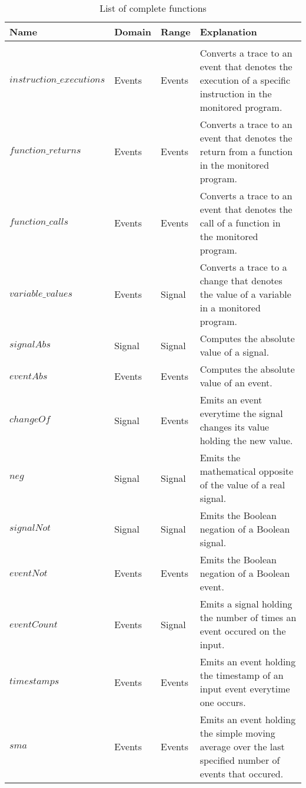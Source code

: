 \begin{table}[!htb]
  \begin{tabularx}{\textwidth}{lllX}
    Name                                  & Domain  & Range   & Explanation \\
    \toprule \\
    \(\mathit{instruction\_executions}\)  & Events  & Events  & Converts a trace to an event that denotes the execution of a specific instruction in the monitored program. \\
    \(\mathit{function\_returns}\)        & Events  & Events  & Converts a trace to an event that denotes the return from a function in the monitored program. \\
    \(\mathit{function\_calls}\)          & Events  & Events  & Converts a trace to an event that denotes the call of a function in the monitored program. \\
    \(\mathit{variable\_values}\)         & Events  & Signal  & Converts a trace to a change that denotes the value of a variable in a monitored program. \\
    \(\mathit{signalAbs}\)                & Signal  & Signal  & Computes the absolute value of a signal. \\
    \(\mathit{eventAbs}\)                 & Events  & Events  & Computes the absolute value of an event. \\
    \(\mathit{changeOf}\)                 & Signal  & Events  & Emits an event everytime the signal changes its value holding the new value. \\
    \(\mathit{neg}\)                      & Signal  & Signal  & Emits the mathematical opposite of the value of a real signal. \\
    \(\mathit{signalNot}\)                & Signal  & Signal  & Emits the Boolean negation of a Boolean signal. \\
    \(\mathit{eventNot}\)                 & Events  & Events  & Emits the Boolean negation of a Boolean event. \\
    \(\mathit{eventCount}\)               & Events  & Signal  & Emits a signal holding the number of times an event occured on the input. \\
    \(\mathit{timestamps}\)               & Events  & Events  & Emits an event holding the timestamp of an input event everytime one occurs. \\
    \(\mathit{sma}\)                      & Events  & Events  & Emits an event holding the simple moving average over the last specified number of events that occured. \\
  \end{tabularx}
\caption{List of complete functions}
\label{table:complete_functions}
\end{table}

